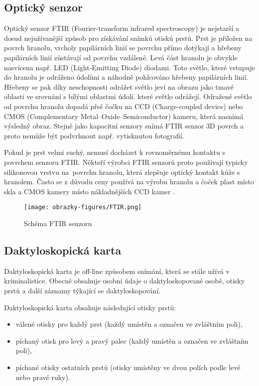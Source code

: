 \subsection*{Optický senzor}
Optický senzor FTIR (Fourier-transform infrared spectroscopy) je nejstarší a dosud nejužívanější způsob pro získávání snímků otisků prstů. Prst je přiložen na povrch hranolu, vrcholy papilárních linií se povrchu přímo dotýkají a hřebeny papilárních linií zůstávají od povrchu vzdálené. Levá část hranolu je obvykle nasvícena např. LED (Light-Emitting Diode) diodami. Toto světlo, které vstupuje do hranolu je odráženo údolími a náhodně pohlcováno hřebeny papilárních linií. Hřebeny se pak díky neschopnosti odrážet světlo jeví na obrazu jako tmavé oblasti ve srovnání s bílými oblastmi údolí. které světlo odrážejí. Odražené světlo od povrchu hranolu dopadá přeš čočku na CCD (Charge-coupled device) nebo CMOS (Complementary Metal–Oxide–Semiconductor) kameru, která nasnímá výsledný obraz. Stejně jako kapacitní senzory snímá FTIR senzor 3D povrch a proto nemůže být podvrhnout např. vytisknutou fotografií.

Pokud je prst velmi suchý, nemusí docházet k rovnoměrnému kontaktu s povrchem senzoru FTIR. Někteří výrobci FTIR senzorů proto používají typicky silikonovou vrstvu na~povrchu hranolu, která zlepšuje optický kontakt kůže s hranolem. Často se z důvodu ceny používá na výrobu hranolu a čoček plast místo skla a CMOS kamery místo nákladnějších CCD kamer \cite{Maltoni2009}.

\begin{figure}[!htbp]
    \centering
    \texttt{[image: obrazky-figures/FTIR.png]}
    \caption{Schéma FTIR senzoru \cite{Maltoni2009}}
\end{figure}
\subsection*{Daktyloskopická karta}
Daktyloskopická karta je off-line způsobem snímání, která se stále užívá v kriminalistice. Obecně obsahuje osobní údaje o daktyloskopované osobě, otisky prstů a další záznamy týkající se daktyloskopování.

Daktyloskopická karta obsahuje následující otisky prstů:
\begin{itemize}
    \item válené otisky pro každý prst (každý umístěn a označen ve zvláštním poli),
    \item píchaný otisk pro levý a pravý palec (každý umístěn a označen ve zvláštním poli),
    \item píchané otisky ostatních prstů (otisky umístěny ve dvou polích podle levé nebo pravé ruky).
\end{itemize}


